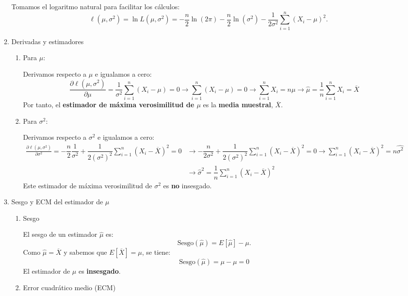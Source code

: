 \begin{enumerate}[label=\color{red}\textbf{\arabic*)}]
\begin{enumerate}[label=\arabic*)]
                Tomamos el logaritmo natural para facilitar los cálculos: \[
                \ell(\mu,\sigma^2)=\ln L(\mu,\sigma^2)=-\dfrac{n}{2}\ln(2\pi)-\dfrac{n}{2}\ln(\sigma^2)-\dfrac{1}{2\sigma^2}\sum_{i=1}^{n} (X_i-\mu)^2.
                \] 
            \item Derivadas y estimadores
                \begin{enumerate}[label=\alph*)]
                    \item Para $\mu$:

                        Derivamos respecto a $\mu$ e igualamos a cero: \[
                        \frac{\partial \ell(\mu,\sigma^2)}{\partial \mu}=\dfrac{1}{\sigma^2}\sum_{i=1}^{n} (X_i-\mu)=0\longrightarrow \sum_{i=1}^{n} (X_i-\mu)=0\longrightarrow \sum_{i=1}^{n} X_i=n\mu\longrightarrow \hat{\mu}=\dfrac{1}{n}\sum_{i=1}^{n} X_i=\overline{X}
                        \] 
                        Por tanto, el \textbf{estimador de máxima verosimilitud de $\mu$} es la \textbf{media muestral}, $\overline{X}$.
                    \item Para $\sigma^2$:

                        Derivamos respecto a $\sigma^2$ e igualamos a cero: \[
                            \begin{aligned}
                                \frac{\partial \ell(\mu,\sigma^2)}{\partial \sigma^2}=-\dfrac{n}{2}\dfrac{1}{\sigma^2}+\dfrac{1}{2(\sigma^2)^2}\sum_{i=1}^{n} (X_i-\overline{X})^2=0 & \longrightarrow -\dfrac{n}{2\sigma^2}+\dfrac{1}{2(\sigma^2)^2}\sum_{i=1}^{n} (X_i-\overline{X})^2=0\longrightarrow \sum_{i=1}^{n} (X_i-\overline{X})^2=n\hat{\sigma^2} \\
                                                                                                                                                                                                      & \longrightarrow \hat{\sigma}^2=\dfrac{1}{n}\sum_{i=1}^{n} (X_i-\overline{X})^2
                            \end{aligned}
                        \]  
                        Este estimador de máxima verosimilitud de $\sigma^2$ es \textbf{no} insesgado.
                \end{enumerate}
            \item Sesgo y ECM del estimador de $\mu$
                \begin{enumerate}[label=\alph*)]
                    \item Sesgo

                        El sesgo de un estimador $\hat{\mu}$ es: \[
                            \mathrm{Sesgo}(\hat{\mu})=E[\hat{\mu}]-\mu.
                        \] 
                        Como $\hat{\mu}=\overline{X}$ y sabemos que $E[\overline{X}]=\mu$, se tiene: \[
                        \mathrm{Sesgo}(\hat{\mu})=\mu-\mu=0
                        \] 
                        El estimador de $\mu$ es \textbf{insesgado}.
                    \item Error cuadrático medio (ECM)


\end{enumerate}
\end{enumerate}
\end{enumerate}
